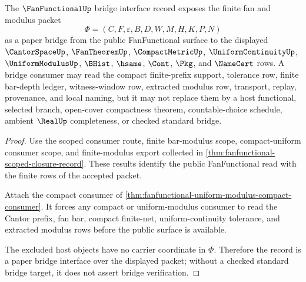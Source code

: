\begin{theorem}
\label{thm:fanfunctional-bridge-interface-record}
The $\FanFunctionalUp$ bridge interface record exposes the finite fan and modulus packet
$$
\Phi=(C,F,\varepsilon,B,D,W,M,H,K,P,N)
$$
as a paper bridge from the public FanFunctional surface to the displayed $\CantorSpaceUp$, $\FanTheoremUp$, $\CompactMetricUp$, $\UniformContinuityUp$, $\UniformModulusUp$, $\BHist$, $\hsame$, $\Cont$, $\Pkg$, and $\NameCert$ rows. A bridge consumer may read the compact finite-prefix support, tolerance row, finite bar-depth ledger, witness-window row, extracted modulus row, transport, replay, provenance, and local naming, but it may not replace them by a host functional, selected branch, open-cover compactness theorem, countable-choice schedule, ambient $\RealUp$ completeness, or checked standard bridge.
\end{theorem}
\begin{proof}
Use the scoped consumer route, finite bar-modulus scope, compact-uniform consumer scope, and finite-modulus export collected in \autoref{thm:fanfunctional-scoped-closure-record}. These results identify the public FanFunctional read with the finite rows of the accepted packet.

Attach the compact consumer of \autoref{thm:fanfunctional-uniform-modulus-compact-consumer}. It forces any compact or uniform-modulus consumer to read the Cantor prefix, fan bar, compact finite-net, uniform-continuity tolerance, and extracted modulus rows before the public surface is available.

The excluded host objects have no carrier coordinate in $\Phi$. Therefore the record is a paper bridge interface over the displayed packet; without a checked standard bridge target, it does not assert bridge verification.
\end{proof}

